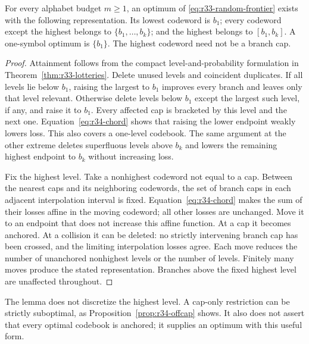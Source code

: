 \begin{lemma}\label{lem:r34-anchor}
For every alphabet budget $m\geq1$, an optimum of \eqref{eq:r33-random-frontier} exists with the following representation. Its lowest codeword is $b_1$; every codeword except the highest belongs to $\{b_1,\ldots,b_k\}$; and the highest belongs to $[b_1,b_k]$. A one-symbol optimum is $\{b_1\}$. The highest codeword need not be a branch cap.
\end{lemma}
\begin{proof}
Attainment follows from the compact level-and-probability formulation in Theorem~\ref{thm:r33-lotteries}. Delete unused levels and coincident duplicates. If all levels lie below $b_1$, raising the largest to $b_1$ improves every branch and leaves only that level relevant. Otherwise delete levels below $b_1$ except the largest such level, if any, and raise it to $b_1$. Every affected cap is bracketed by this level and the next one. Equation~\eqref{eq:r34-chord} shows that raising the lower endpoint weakly lowers loss. This also covers a one-level codebook. The same argument at the other extreme deletes superfluous levels above $b_k$ and lowers the remaining highest endpoint to $b_k$ without increasing loss.

Fix the highest level. Take a nonhighest codeword not equal to a cap. Between the nearest caps and its neighboring codewords, the set of branch caps in each adjacent interpolation interval is fixed. Equation~\eqref{eq:r34-chord} makes the sum of their losses affine in the moving codeword; all other losses are unchanged. Move it to an endpoint that does not increase this affine function. At a cap it becomes anchored. At a collision it can be deleted: no strictly intervening branch cap has been crossed, and the limiting interpolation losses agree. Each move reduces the number of unanchored nonhighest levels or the number of levels. Finitely many moves produce the stated representation. Branches above the fixed highest level are unaffected throughout.\end{proof}

The lemma does not discretize the highest level. A cap-only restriction can be strictly suboptimal, as Proposition~\ref{prop:r34-offcap} shows. It also does not assert that every optimal codebook is anchored; it supplies an optimum with this useful form.

